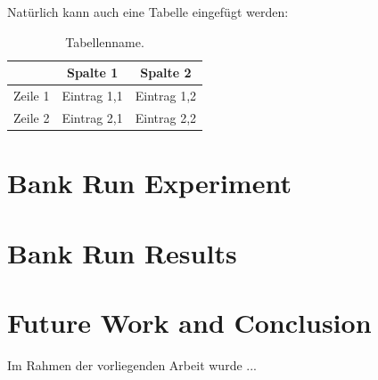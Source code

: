 Nat\"urlich kann auch eine Tabelle eingef\"ugt werden:
\begin{table}[htbp]
	\caption{Tabellenname.}
	\centering
		\begin{tabular}{|l|c|c|}
			\hline
			 & Spalte 1 & Spalte 2\\
			 \hline
			 Zeile 1 & Eintrag 1,1 & Eintrag 1,2\\
			 \hline
			 Zeile 2 & Eintrag 2,1 & Eintrag 2,2\\
			 \hline			
		\end{tabular}
	\label{tab:tabellenreferenz1}
\end{table}

\chapter{Bank Run Experiment} \label{cha:bankRunExperiment}

\chapter{Bank Run Results} \label{cha:bankrunResults}

\chapter{Future Work and Conclusion}

Im Rahmen der vorliegenden Arbeit wurde ...

